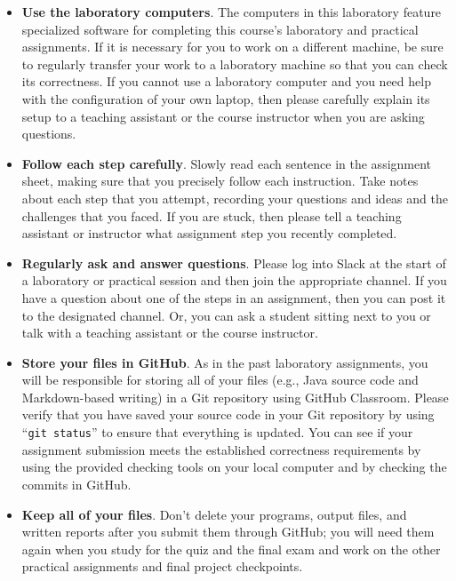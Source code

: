 \documentclass[11pt]{article}
\newcommand{\command}[1]{``\lstinline{#1}''}
\begin{document}
\begin{itemize}
  \setlength{\itemsep}{0pt}

\item {\bf Use the laboratory computers}. The computers in this laboratory feature specialized software for completing
  this course's laboratory and practical assignments. If it is necessary for you to work on a different machine, be sure
  to regularly transfer your work to a laboratory machine so that you can check its correctness. If you cannot use a
  laboratory computer and you need help with the configuration of your own laptop, then please carefully explain its
  setup to a teaching assistant or the course instructor when you are asking questions.

\item {\bf Follow each step carefully}. Slowly read each sentence in the assignment sheet, making sure that you
  precisely follow each instruction. Take notes about each step that you attempt, recording your questions and ideas and
  the challenges that you faced. If you are stuck, then please tell a teaching assistant or instructor what assignment
  step you recently completed.

\item {\bf Regularly ask and answer questions}. Please log into Slack at the start of a laboratory or practical session
  and then join the appropriate channel. If you have a question about one of the steps in an assignment, then you can
  post it to the designated channel. Or, you can ask a student sitting next to you or talk with a teaching assistant or
  the course instructor.

\item {\bf Store your files in GitHub}. As in the past laboratory assignments, you will be responsible for storing all
  of your files (e.g., Java source code and Markdown-based writing) in a Git repository using GitHub Classroom. Please
  verify that you have saved your source code in your Git repository by using \command{git status} to ensure that
  everything is updated. You can see if your assignment submission meets the established correctness requirements by
  using the provided checking tools on your local computer and by checking the commits in GitHub.

\item {\bf Keep all of your files}. Don't delete your programs, output files, and written reports after you submit them
  through GitHub; you will need them again when you study for the quiz and the final exam and work on the other
  practical assignments and final project checkpoints.


\end{itemize}
\end{document}
